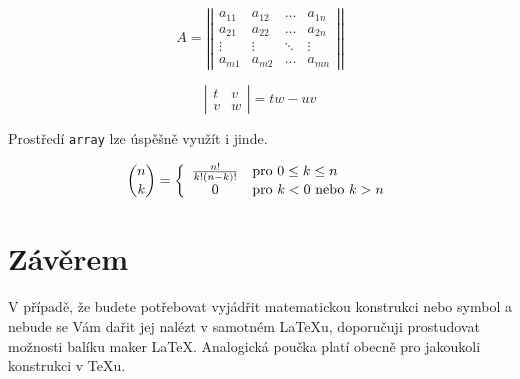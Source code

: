 \documentclass[a4paper, twocolumn, 11pt]{article}
\theoremstyle{definition}
\begin{document}
$$A = \left|\left| {\begin{array}{cccc}
a_{11} & a_{12} & \ldots & a_{1n} \\
a_{21} & a_{22} & \ldots & a_{2n} \\
\vdots & \vdots & \ddots & \vdots \\
a_{m1} & a_{m2} & \ldots & a_{mn}
\end{array}} \right|\right| $$

$$\left| {\begin{array}{cc}
t & v \\
v & w
\end{array}}\right| = tw - uv $$


Prostředí \texttt{array} lze úspěšně využít i jinde.

$$\dbinom{n}{k} = \left\{
\begin{array}{c l}
\frac{n!}{k!(n-k)!} & \text{pro }  0 \leq k \leq n \\
0 & \text{pro } k < 0 \text{ nebo } k > n
\end{array} \right. $$

\section{Závěrem}

V případě, že budete potřebovat vyjádřit matematickou konstrukci nebo symbol a nebude se Vám dařit jej nalézt v samotném \LaTeX{u}, doporučuji prostudovat možnosti balíku maker \AmS{-}\LaTeX.
Analogická poučka platí obecně pro jakoukoli konstrukci v \TeX{u}.
\end{document}
